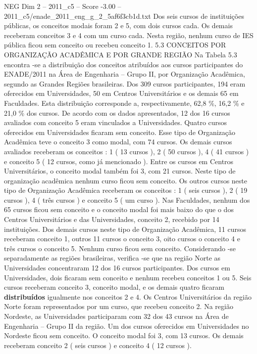 \begin{textsample}{NEG Dim 2 – 2011\_c5 – Score -3.00 – 2011\_c5/enade\_2011\_eng\_g\_2\_5af6f3cb1d.txt}
Dos seis cursos de instituições públicas, os conceitos modais foram 2 e 5, com dois cursos cada.
Os demais receberam conceitos 3 e 4 com um curso cada.
Nesta região, nenhum curso de IES pública ficou sem conceito ou recebeu conceito 1. 5.3 CONCEITOS POR ORGANIZAÇÃO ACADÊMICA E POR GRANDE REGIÃO Na Tabela 5.3 encontra -se a distribuição dos conceitos atribuídos aos cursos participantes do ENADE/2011 na Área de Engenharia – Grupo II, por Organização Acadêmica, segundo as Grandes Regiões brasileiras.
Dos 309 cursos participantes, 194 eram oferecidos em Universidades, 50 em Centros Universitários e os demais 65 em Faculdades.
Esta distribuição corresponde a, respectivamente, 62,8 \%, 16,2 \% e 21,0 \% dos cursos.
De acordo com os dados apresentados, 12 dos 16 cursos avaliados com conceito 5 eram vinculados a Universidades.
Quatro cursos oferecidos em Universidades ficaram sem conceito.
Esse tipo de Organização Acadêmica teve o conceito 3 como modal, com 74 cursos.
Os demais cursos avaliados receberam os conceitos : 1 ( 13 cursos ), 2 ( 50 cursos ), 4 ( 41 cursos ) e conceito 5 ( 12 cursos, como já mencionado ).
Entre os cursos em Centros Universitários, o conceito modal também foi 3, com 21 cursos.
Neste tipo de organização acadêmica nenhum curso ficou sem conceito.
Os outros cursos neste tipo de Organização Acadêmica receberam os conceitos : 1 ( seis cursos ), 2 ( 19 cursos ), 4 ( três cursos ) e conceito 5 ( um curso ).
Nas Faculdades, nenhum dos 65 cursos ficou sem conceito e o conceito modal foi mais baixo do que o dos Centros Universitários e das Universidades, conceito 2, recebido por 14 instituições.
Dos demais cursos neste tipo de Organização Acadêmica, 11 cursos receberam conceito 1, outros 11 cursos o conceito 3, oito cursos o conceito 4 e três cursos o conceito 5.
Nenhum curso ficou sem conceito.
Considerando -se separadamente as regiões brasileiras, verifica -se que na região Norte as Universidades concentraram 12 dos 16 cursos participantes.
Dos cursos em Universidades, dois ficaram sem conceito e nenhum recebeu conceitos 1 ou 5.
Seis cursos receberam conceito 3, conceito modal, e os demais quatro ficaram \textbf{distribuídos} igualmente nos conceitos 2 e 4.
Os Centros Universitários da região Norte foram representados por um curso, que recebeu conceito 2.
Na região Nordeste, as Universidades participaram com 32 dos 43 cursos na Área de Engenharia – Grupo II da região.
Um dos cursos oferecidos em Universidades no Nordeste ficou sem conceito.
O conceito modal foi 3, com 13 cursos.
Os demais receberam conceito 2 ( seis cursos ) e conceito 4 ( 12 cursos ).

\end{textsample}
